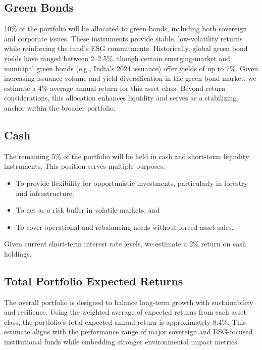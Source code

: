 \subsection{Green Bonds}
10\% of the portfolio will be allocated to green bonds, including both sovereign and corporate issues. These instruments provide stable, low-volatility returns while reinforcing the fund’s ESG commitments. Historically, global green bond yields have ranged between 2–2.5\%, though certain emerging-market and municipal green bonds (e.g., India’s 2024 issuance) offer yields of up to 7\%.
Given increasing issuance volume and yield diversification in the green bond market, we estimate a 4\% average annual return for this asset class. Beyond return considerations, this allocation enhances liquidity and serves as a stabilizing anchor within the broader portfolio.

\subsection{Cash}
The remaining 5\% of the portfolio will be held in cash and short-term liquidity instruments. This position serves multiple purposes: 
\begin{itemize}
    \item To provide flexibility for opportunistic investments, particularly in forestry and infrastructure;
    \item To act as a risk buffer in volatile markets; and 
    \item To cover operational and rebalancing needs without forced asset sales.
\end{itemize}
Given current short-term interest rate levels, we estimate a 2\% return on cash holdings.

\subsection{Total Portfolio Expected Returns}
The overall portfolio is designed to balance long-term growth with sustainability and resilience. Using the weighted average of expected returns from each asset class, the portfolio’s total expected annual return is approximately 8.4\%. This estimate aligns with the performance range of major sovereign and ESG-focused institutional funds while embedding stronger environmental impact metrics. 

